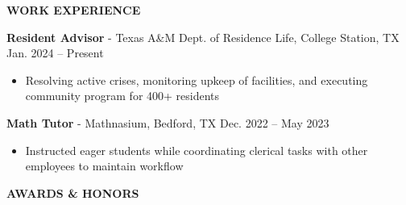 \documentclass[18pt]{article}
\begin{document}
\begin{center}
    \vspace{-0.5\baselineskip}
    \textbf{WORK EXPERIENCE}
    \hrulefill
\end{center}
\vspace{-0.5\baselineskip}

\noindent\textbf{Resident Advisor} - Texas A\&M Dept. of Residence Life, College Station, TX \hfill Jan. 2024 – Present \hspace{0pt} %

\vspace{-.75\baselineskip}
\begin{itemize}[noitemsep]
  \item Resolving active crises, monitoring upkeep of facilities, and executing community program for 400+ residents
\end{itemize}

\vspace{-0.5\baselineskip}
\textbf{Math Tutor} - Mathnasium, Bedford, TX \hfill Dec. 2022 – May 2023 \hspace{0pt}

\vspace{-0.75\baselineskip}
\begin{itemize}[noitemsep]
  \item Instructed eager students while coordinating clerical tasks with other employees to maintain workflow
\end{itemize}


\begin{center}
    \vspace{-0.5\baselineskip}
    \textbf{AWARDS \& HONORS}
    \hrulefill
\end{center}
\vspace{-0.5\baselineskip}
\end{document}
